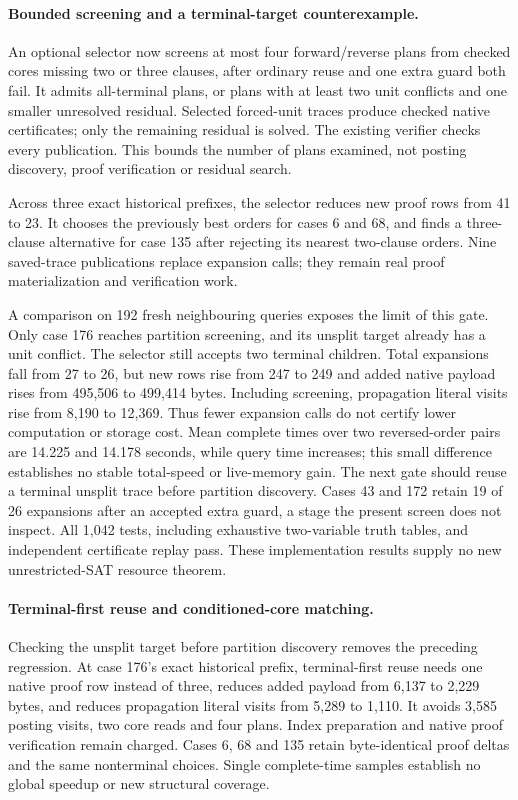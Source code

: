 \documentclass[11pt,a4paper]{article}
\numberwithin{equation}{section}
\theoremstyle{plain}
\theoremstyle{definition}
\theoremstyle{remark}
\begin{document}
\paragraph{Bounded screening and a terminal-target counterexample.}
An optional selector now screens at most four forward/reverse plans from checked
cores missing two or three clauses, after ordinary reuse and one extra guard
both fail. It admits all-terminal plans, or plans with at least two unit
conflicts and one smaller unresolved residual. Selected forced-unit traces
produce checked native certificates; only the remaining residual is solved.
The existing verifier checks every publication. This bounds the number of
plans examined, not posting discovery, proof verification or residual search.

Across three exact historical prefixes, the selector reduces new proof rows
from 41 to 23. It chooses the previously best orders for cases 6 and 68, and
finds a three-clause alternative for case 135 after rejecting its nearest
two-clause orders. Nine saved-trace publications replace expansion calls;
they remain real proof materialization and verification work.

A comparison on 192 fresh neighbouring queries exposes the limit of this gate.
Only case 176 reaches partition screening, and its unsplit target already has
a unit conflict. The selector still accepts two terminal children. Total
expansions fall from 27 to 26, but new rows rise from 247 to 249 and added native
payload rises from 495,506 to 499,414 bytes. Including screening, propagation
literal visits rise from 8,190 to 12,369. Thus fewer expansion calls do not
certify lower computation or storage cost. Mean complete times over two
reversed-order pairs are 14.225 and 14.178 seconds, while query time increases;
this small difference establishes no stable total-speed or live-memory gain.
The next gate should reuse a terminal unsplit trace before partition discovery.
Cases 43 and 172 retain 19 of 26 expansions after an accepted extra guard, a
stage the present screen does not inspect. All 1,042 tests, including exhaustive
two-variable truth tables, and independent certificate replay pass. These
implementation results supply no new unrestricted-SAT resource theorem.

\paragraph{Terminal-first reuse and conditioned-core matching.}
Checking the unsplit target before partition discovery removes the preceding
regression. At case 176's exact historical prefix, terminal-first reuse needs
one native proof row instead of three, reduces added payload from 6,137 to
2,229 bytes, and reduces propagation literal visits from 5,289 to 1,110. It avoids
3,585 posting visits, two core reads and four plans. Index preparation and native
proof verification remain charged. Cases 6, 68 and 135 retain byte-identical
proof deltas and the same nonterminal choices. Single complete-time samples
establish no global speedup or new structural coverage.
\end{document}
